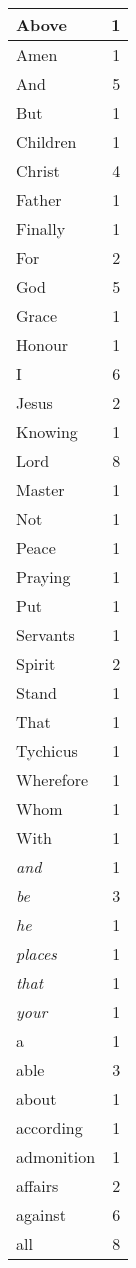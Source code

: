 \begin{center}
\begin{longtable}{l|r}
Above & 1\\ \hline 
Amen & 1\\ \hline 
And & 5\\ \hline 
But & 1\\ \hline 
Children & 1\\ \hline 
Christ & 4\\ \hline 
Father & 1\\ \hline 
Finally & 1\\ \hline 
For & 2\\ \hline 
God & 5\\ \hline 
Grace & 1\\ \hline 
Honour & 1\\ \hline 
I & 6\\ \hline 
Jesus & 2\\ \hline 
Knowing & 1\\ \hline 
Lord & 8\\ \hline 
Master & 1\\ \hline 
Not & 1\\ \hline 
Peace & 1\\ \hline 
Praying & 1\\ \hline 
Put & 1\\ \hline 
Servants & 1\\ \hline 
Spirit & 2\\ \hline 
Stand & 1\\ \hline 
That & 1\\ \hline 
Tychicus & 1\\ \hline 
Wherefore & 1\\ \hline 
Whom & 1\\ \hline 
With & 1\\ \hline 
\emph{and} & 1\\ \hline 
\emph{be} & 3\\ \hline 
\emph{he} & 1\\ \hline 
\emph{places} & 1\\ \hline 
\emph{that} & 1\\ \hline 
\emph{your} & 1\\ \hline 
a & 1\\ \hline 
able & 3\\ \hline 
about & 1\\ \hline 
according & 1\\ \hline 
admonition & 1\\ \hline 
affairs & 2\\ \hline 
against & 6\\ \hline 
all & 8\\ \hline 

\end{longtable}
\end{center}
